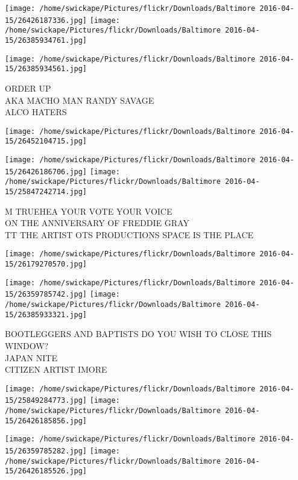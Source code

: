 \documentclass[10pt,letterpaper]{article}
\begin{document}
\texttt{[image: /home/swickape/Pictures/flickr/Downloads/Baltimore 2016-04-15/26426187336.jpg]}
\texttt{[image: /home/swickape/Pictures/flickr/Downloads/Baltimore 2016-04-15/26385934761.jpg]}

\texttt{[image: /home/swickape/Pictures/flickr/Downloads/Baltimore 2016-04-15/26385934561.jpg]}

ORDER UP\\
AKA MACHO MAN RANDY SAVAGE\\
ALCO HATERS\\
\pagebreak

\texttt{[image: /home/swickape/Pictures/flickr/Downloads/Baltimore 2016-04-15/26452104715.jpg]}

\vspace{0.25in}
\texttt{[image: /home/swickape/Pictures/flickr/Downloads/Baltimore 2016-04-15/26426186706.jpg]}
\texttt{[image: /home/swickape/Pictures/flickr/Downloads/Baltimore 2016-04-15/25847242714.jpg]}

M TRUEHEA YOUR VOTE YOUR VOICE\\
ON THE ANNIVERSARY OF FREDDIE GRAY\\
TT THE ARTIST OTS PRODUCTIONS SPACE IS THE PLACE\\
\pagebreak

\texttt{[image: /home/swickape/Pictures/flickr/Downloads/Baltimore 2016-04-15/26179270570.jpg]}

\vspace{0.25in}
\texttt{[image: /home/swickape/Pictures/flickr/Downloads/Baltimore 2016-04-15/26359785742.jpg]}
\texttt{[image: /home/swickape/Pictures/flickr/Downloads/Baltimore 2016-04-15/26385933321.jpg]}

BOOTLEGGERS AND BAPTISTS DO YOU WISH TO CLOSE THIS WINDOW?\\
JAPAN NITE\\
CITIZEN ARTIST IMORE\\
\pagebreak

\texttt{[image: /home/swickape/Pictures/flickr/Downloads/Baltimore 2016-04-15/25849284773.jpg]}
\texttt{[image: /home/swickape/Pictures/flickr/Downloads/Baltimore 2016-04-15/26426185856.jpg]}

\texttt{[image: /home/swickape/Pictures/flickr/Downloads/Baltimore 2016-04-15/26359785282.jpg]}
\texttt{[image: /home/swickape/Pictures/flickr/Downloads/Baltimore 2016-04-15/26426185526.jpg]}
\end{document}
